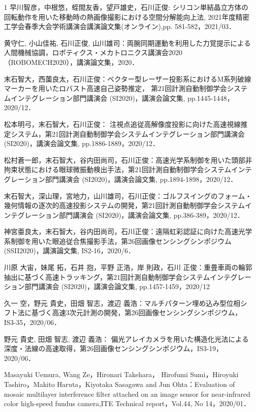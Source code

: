 \begin{発表}{1}
早川智彦，中根悠，蛭間友香，望戸雄史，石川正俊: シリコン単結晶立方体の回転動作を用いた移動時の熱画像撮影における空間分解能向上法, 2021年度精密工学会春季大会学術講演会講演論文集(オンライン),pp. 581-582，2021/03．

黄守仁, 小山佳祐, 石川正俊, 山川雄司：両腕同期運動を利用した力覚提示による人間機械協調，ロボティクス・メカトロニクス講演会2020（ROBOMECH2020），講演論文集，2020．

末石智大，西薗良太，石川正俊：ベクター型レーザー投影系におけるM系列破線マーカーを用いたロバスト高速自己姿勢推定， 第21回計測自動制御学会システムインテグレーション部門講演会 (SI2020)，講演会論文集, pp.1445-1448，2020/12．

松本明弓，末石智大，石川正俊： 注視点追従高解像度投影に向けた高速視線推定システム，第21回計測自動制御学会システムインテグレーション部門講演会 (SI2020)，講演会論文集, pp.1886-1889，2020/12．

松村蒼一郎，末石智大，谷内田尚司，石川正俊：高速光学系制御を用いた頭部非拘束状態における眼球微振動検出手法，第21回計測自動制御学会システムインテグレーション部門講演会 (SI2020)，講演会論文集, pp.1894-1898，2020/12．

末石智大，深山理，宮地力，山川雄司，石川正俊：ゴルフスイングのフォーム・幾何情報の逐次的高速投影システムの開発，第21回計測自動制御学会システムインテグレーション部門講演会 (SI2020)，講演会論文集, pp.386-389，2020/12．

神宮亜良太，末石智大，谷内田尚司，石川正俊：遠隔虹彩認証に向けた高速光学系制御を用いた眼追従合焦撮影手法，第26回画像センシングシンポジウム (SSII2020)，講演論文集, IS2-16，2020/6．


川原 大宙，妹尾 拓，石井 抱，平野 正浩，岸 則政，石川 正俊：重畳車両の輪郭抽出に基づく高速トラッキング，第21回計測自動制御学会システムインテグレーション部門講演会 (SI2020)，講演会論文集, pp.1457-1459，2020/12

久一 空，野元 貴史，田畑 智志，渡辺 義浩：マルチパターン埋め込み型位相シフト法に基づく高速3次元計測の開発，第26回画像センシングシンポジウム，IS3-35，2020/06．

野元 貴史, 田畑 智志, 渡辺 義浩： 偏光アレイカメラを用いた構造化光法による深度・法線の高速取得，第26回画像センシングシンポジウム，IS3-19，2020/06．

Masayuki Uemura, Wang Ze，Hironari Takehara， Hirofumi Sumi，Hiroyuki Tashiro，Makito Haruta，Kiyotaka Sasagawa and Jun Ohta：Evaluation of mosaic multilayer interference filter attached on an image sensor for near-infrared color high-speed fundus camera,ITE Technical report，Vol.44, No 14，2020/01．


\end{発表}
